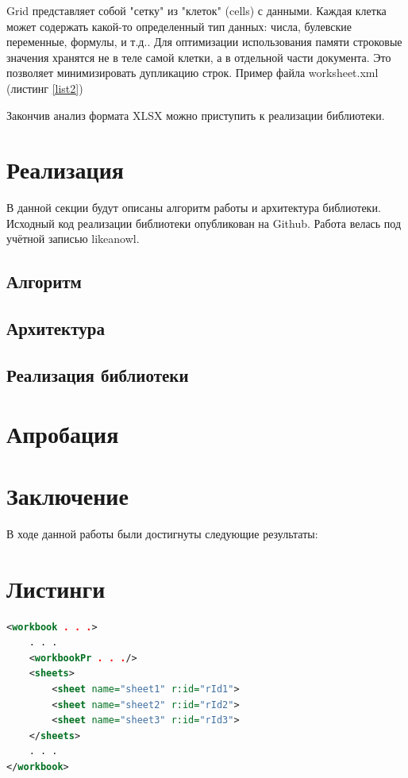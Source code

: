 \documentclass[14pt]{matmex-diploma}
\begin{document}
Grid представляет собой "сетку" из "клеток" (cells) с данными. Каждая клетка может содержать какой-то определенный тип данных: числа, булевские переменные, формулы, и т.д.. Для оптимизации использования памяти строковые значения хранятся не в теле самой клетки, а в отдельной части документа. Это позволяет минимизировать дупликацию строк. Пример файла worksheet.xml (листинг \ref{list2})

Закончив анализ формата XLSX можно приступить к реализации библиотеки.
\section{Реализация}
В данной секции будут описаны алгоритм работы и архитектура библиотеки. Исходный код реализации библиотеки опубликован на Github. Работа велась под учётной записью likeanowl. 
\subsection{Алгоритм}

\subsection{Архитектура}



\subsection{Реализация библиотеки}
\section{Апробация}


\section*{Заключение}
В ходе данной работы были достигнуты следующие результаты:

\section*{Листинги}
\begin{lstlisting}[language=XML, caption={Пример файла workbook.xml},captionpos=b, label=list1]
<workbook . . .>
    . . .
    <workbookPr . . ./>
    <sheets>
        <sheet name="sheet1" r:id="rId1">
        <sheet name="sheet2" r:id="rId2">
        <sheet name="sheet3" r:id="rId3">
    </sheets>
    . . .
</workbook>
\end{lstlisting}
\end{document}
